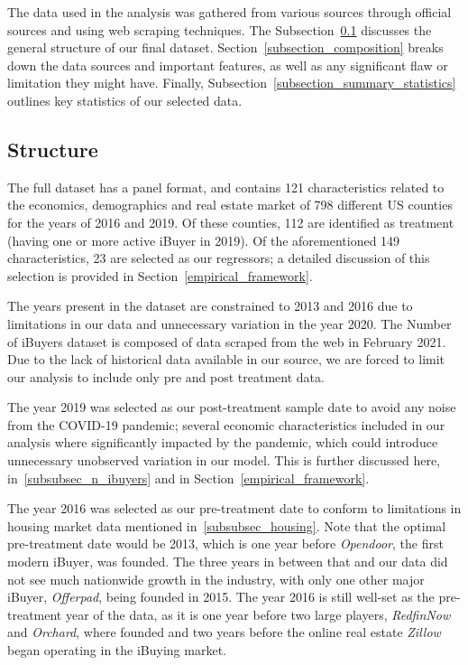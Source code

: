 The data used in the analysis was gathered from various sources through official sources and using web scraping techniques. The Subsection~\ref{subsection_structure} discusses the general structure of our final dataset. Section~\ref{subsection_composition} breaks down the data sources and important features, as well as any significant flaw or limitation they might have. Finally, Subsection~\ref{subsection_summary_statistics} outlines key statistics of our selected data. 

\subsection{Structure}\label{subsection_structure}
The full dataset has a panel format, and contains 121 characteristics related to the economics, demographics and real estate market of 798 different US counties for the years of 2016 and 2019. Of these counties, 112 are identified as treatment (having one or more active iBuyer in 2019). Of the aforementioned 149 characteristics, 23 are selected as our regressors; a detailed discussion of this selection is provided in Section~\ref{empirical_framework}.

The years present in the dataset are constrained to 2013 and 2016 due to limitations in our data and unnecessary variation in the year 2020. The Number of iBuyers dataset is composed of data scraped from the web in February 2021. Due to the lack of historical data available in our source, we are forced to limit our analysis to include only pre and post treatment data. 

The year 2019 was selected as our post-treatment sample date to avoid any noise from the COVID-19 pandemic; several economic characteristics included in our analysis where significantly impacted by the pandemic, which could introduce unnecessary unobserved variation in our model. This is further discussed here, in~\ref{subsubsec_n_ibuyers} and in Section~\ref{empirical_framework}.

The year 2016 was selected as our pre-treatment date to conform to limitations in housing market data mentioned in~\ref{subsubsec_housing}. Note that the optimal pre-treatment date would be 2013, which is one year before \textit{Opendoor}, the first modern iBuyer, was founded. The three years in between that and our data did not see much nationwide growth in the industry, with only one other major iBuyer, \textit{Offerpad}, being founded in 2015. The year 2016 is still well-set as the pre-treatment year of the data, as it is one year before two large players, \textit{RedfinNow} and \textit{Orchard}, where founded and two years before the online real estate \textit{Zillow} began operating in the iBuying market.


